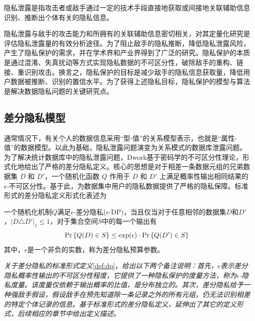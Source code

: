 \begin{definition}\label{def:chapter03-privacy_leakage}隐私泄露是指攻击者或敌手通过一定的技术手段直接地获取或间接地关联辅助信息识别、推断出个体有关的隐私信息。
\end{definition}
隐私泄露与敌手的攻击能力和所拥有的关联辅助信息密切相关，对其定量化研究是评估隐私泄露量的有效分析途径。为了阻止敌手的隐私推断，降低隐私泄露风险，产生了隐私保护的需求，并在学术界和产业界得到了广泛的研究。隐私保护的本质是通过混淆、失真扰动等方式实现隐私数据的不可区分性，破除敌手的重构、链接、重识别攻击。换言之，隐私保护的目标是减少敌手的隐私信息获取量，降低用户数据被推断、识别的置信水平。为了获得上述隐私目标，隐私保护的模型与算法是解决数据隐私问题的关键研究点。

\subsection{差分隐私模型}
通常情况下，有关个人的数据信息采用``型-值''的关系模型表示，也就是``属性-值''的数据模型。以此为基础，隐私泄露问题演变为关系模式的数据库泄露问题。为了解决统计数据库中的隐私泄露问题，Dwork\cite{dwork2006calibrating,dwork2006differential,dwork2014algorithmic,dwork2015the}基于密码学的不可区分性理论，形式化地给出了严格的差分隐私定义。核心的思想是对于相差一条数据元组的兄弟数据集 $D$ 和 $D'$，一个随机化函数 $Q$ 作用于 $D$ 和 $D'$ 上满足概率性输出相同结果的$\epsilon$-不可区分性。基于此，为数据集中用户的隐私数据提供了严格的隐私保障。标准形式的差分隐私定义形式化表述为
\begin{definition}\label{def:dp}一个随机化机制$Q$满足$\epsilon$-差分隐私($\epsilon$-DP)，当且仅当对于任意相邻的数据集$D$和$D'$，$|D\triangle D'|_1\leq 1$，对于集合空间$S$中的每一个输出有
	\begin{equation}
		{\rm Pr}\left\{Q(D)\in S\right\} \leq  \exp(\epsilon)\cdot {\rm Pr}\left\{Q(D')\in S\right\}
	\end{equation}
其中，$\epsilon$是一个非负的实数，称为差分隐私预算参数。
\end{definition}

\begin{remark}{\em
关于差分隐私的标准形式定义}\ref{def:dp}，{\em 给出以下两个备注说明：首先，$\epsilon$表示差分隐私概率性输出的不可区分性程度，它提供了一种隐私保护的度量方法，称为$\epsilon$-隐私度量。该度量仅依赖于输出概率的比值，是分布独立的。其次，差分隐私给予一种强敌手假设，假设敌手在预先知道除一条记录之外的所有元组，仍无法识别相差的特定个体记录的信息。基于标准形式的差分隐私定义，延伸出了其它的定义形式，后续相应的章节中给出定义描述。}
\end{remark}
